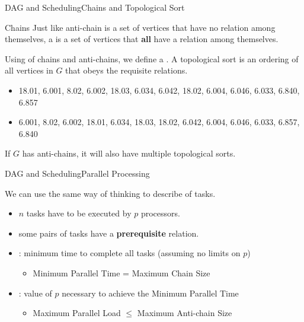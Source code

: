 \begin{frame}{DAG and Scheduling}{Chains and Topological Sort}

  \begin{block}{Chains}
    Just like anti-chain is a set of vertices that have no relation among themselves, a  is a set of vertices that {\bf all} have a relation among themselves.
  \end{block}\medskip

  Using of chains and anti-chains, we define a . A topological sort is an ordering of all vertices in $G$ that obeys the requisite relations.
  \begin{itemize}
    \item 18.01, 6.001, 8.02, 6.002, 18.03, 6.034, 6.042, 18.02, 6.004, 6.046, 6.033, 6.840, 6.857
    \item 6.001, 8.02, 6.002, 18.01, 6.034, 18.03, 18.02, 6.042, 6.004, 6.046, 6.033, 6.857, 6.840
  \end{itemize}
  If $G$ has anti-chains, it will also have multiple topological sorts.

\end{frame}

\begin{frame}{DAG and Scheduling}{Parallel Processing}

  We can use the same way of thinking to describe  of tasks.\bigskip

  \begin{itemize}
    \item $n$ tasks have to be executed by $p$ processors.
    \item some pairs of tasks have a {\bf prerequisite} relation.
    \item {}: minimum time to complete all tasks (assuming no limits on $p$)
      \begin{itemize}
        \item Minimum Parallel Time = Maximum Chain Size
      \end{itemize}
    \item {}: value of $p$ necessary to achieve the Minimum Parallel Time
    \begin{itemize}
      \item Maximum Parallel Load $\leq$ Maximum Anti-chain Size
    \end{itemize}
  \end{itemize}
\end{frame}

